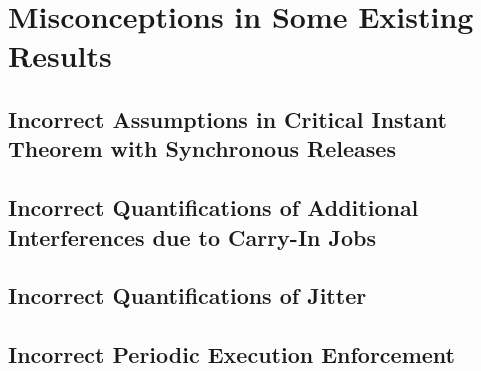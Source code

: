 
\section{Misconceptions in Some Existing Results}
\subsection{Incorrect Assumptions in Critical Instant Theorem with Synchronous Releases}
\label{sec:wrong-critical}

\subsection{Incorrect Quantifications of Additional Interferences due to Carry-In Jobs}
\label{sec:wrong-carryin}

\subsection{Incorrect Quantifications of Jitter}
\label{sec:wrong-jitter}


\subsection{Incorrect Periodic Execution Enforcement}
\label{sec:wrong-periodic}


